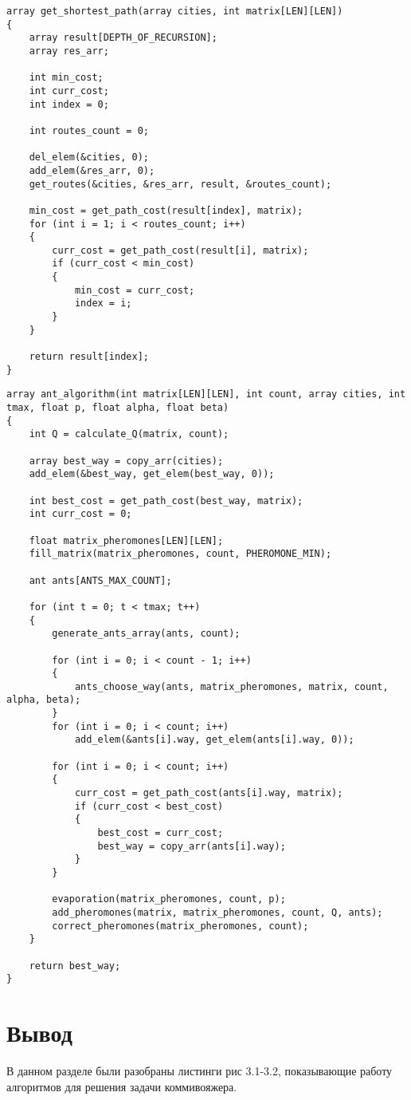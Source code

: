 \begin{lstlisting}[label=some-code,caption=Алгоритм полного перебора]
array get_shortest_path(array cities, int matrix[LEN][LEN])
{
	array result[DEPTH_OF_RECURSION];
	array res_arr;

	int min_cost;
	int curr_cost;
	int index = 0;

	int routes_count = 0;

	del_elem(&cities, 0);
	add_elem(&res_arr, 0);
	get_routes(&cities, &res_arr, result, &routes_count);

	min_cost = get_path_cost(result[index], matrix);
	for (int i = 1; i < routes_count; i++)
	{
		curr_cost = get_path_cost(result[i], matrix);
		if (curr_cost < min_cost)
		{
			min_cost = curr_cost;
			index = i;
		}
	}

	return result[index];
}
\end{lstlisting}

\begin{lstlisting}[label=some-code,caption=Муравьиный алгоритм]
array ant_algorithm(int matrix[LEN][LEN], int count, array cities, int tmax, float p, float alpha, float beta)
{
	int Q = calculate_Q(matrix, count);

	array best_way = copy_arr(cities);
	add_elem(&best_way, get_elem(best_way, 0));

	int best_cost = get_path_cost(best_way, matrix);
	int curr_cost = 0;

	float matrix_pheromones[LEN][LEN];
	fill_matrix(matrix_pheromones, count, PHEROMONE_MIN);

	ant ants[ANTS_MAX_COUNT];

	for (int t = 0; t < tmax; t++)
	{
		generate_ants_array(ants, count);

		for (int i = 0; i < count - 1; i++)
		{
			ants_choose_way(ants, matrix_pheromones, matrix, count, alpha, beta);
		}
		for (int i = 0; i < count; i++)
			add_elem(&ants[i].way, get_elem(ants[i].way, 0));

		for (int i = 0; i < count; i++)
		{
			curr_cost = get_path_cost(ants[i].way, matrix);
			if (curr_cost < best_cost)
			{
				best_cost = curr_cost;
				best_way = copy_arr(ants[i].way);
			}
		}

		evaporation(matrix_pheromones, count, p);
		add_pheromones(matrix, matrix_pheromones, count, Q, ants);
		correct_pheromones(matrix_pheromones, count);
	}

	return best_way;
}
\end{lstlisting}


\section{Вывод}

В данном разделе были разобраны листинги рис 3.1-3.2, показывающие работу алгоритмов для решения задачи коммивояжера.